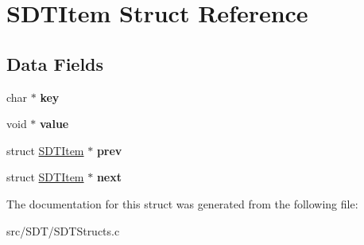 \hypertarget{struct_s_d_t_item}{}\section{S\+D\+T\+Item Struct Reference}
\label{struct_s_d_t_item}
\subsection*{Data Fields}
\begin{DoxyCompactItemize}
\item 
\hypertarget{struct_s_d_t_item_a5892a9181e6a332f84d27aecd41dcd12}{}char $\ast$ {\bfseries key}\label{struct_s_d_t_item_a5892a9181e6a332f84d27aecd41dcd12}

\item 
\hypertarget{struct_s_d_t_item_a0f61d63b009d0880a89c843bd50d8d76}{}void $\ast$ {\bfseries value}\label{struct_s_d_t_item_a0f61d63b009d0880a89c843bd50d8d76}

\item 
\hypertarget{struct_s_d_t_item_a7ca68db37da29b5dd5d997394be9c621}{}struct \hyperlink{struct_s_d_t_item}{S\+D\+T\+Item} $\ast$ {\bfseries prev}\label{struct_s_d_t_item_a7ca68db37da29b5dd5d997394be9c621}

\item 
\hypertarget{struct_s_d_t_item_a332be19e6d5da167d8de43a116f6b07a}{}struct \hyperlink{struct_s_d_t_item}{S\+D\+T\+Item} $\ast$ {\bfseries next}\label{struct_s_d_t_item_a332be19e6d5da167d8de43a116f6b07a}

\end{DoxyCompactItemize}


The documentation for this struct was generated from the following file\+:\begin{DoxyCompactItemize}
\item 
src/\+S\+D\+T/S\+D\+T\+Structs.\+c\end{DoxyCompactItemize}
